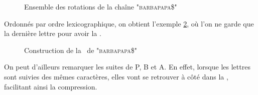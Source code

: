 \begin{figure}[h!]
\caption{Ensemble des rotations de la chaîne "\textsc{barbapapa\$}"}
\label{rotations}
\end{figure}

Ordonnés par ordre lexicographique, on obtient l'exemple \ref{bwt}, où l'on ne garde que la dernière lettre pour avoir la \bwt.
\begin{figure}[h!]
\caption{Construction de la \bwt\ de "\textsc{barbapapa\$}"}
\label{bwt}
\end{figure}

On peut d'ailleurs remarquer les suites de P, B et A. En effet, lorsque les lettres sont suivies des mêmes caractères, elles vont se retrouver à côté dans la \bwt, facilitant ainsi la compression.

